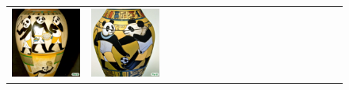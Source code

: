 \begin{figure}[ht!]
\begin{adjustwidth}{-0.8in}{-0.5in}
\begin{tabular}{cccccccccccccccccccc}
\multicolumn{2}{c}{\includegraphics[width=\threebythreecolwidth\textwidth]{figures/cherries/panda_tennis.jpg}} &
\multicolumn{2}{c}{\includegraphics[width=\threebythreecolwidth\textwidth]{figures/cherries/panda_soccer.jpg}} &

\end{tabular}
\end{adjustwidth}
\end{figure}
